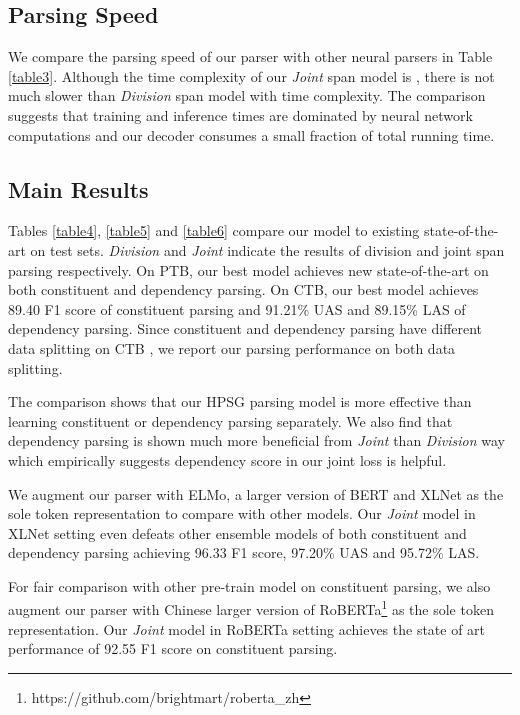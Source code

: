 \documentclass[11pt,a4paper]{article}
\begin{document}
\subsection{Parsing Speed}

We compare the
parsing speed of our parser with other neural parsers in Table \ref{table3}.
Although the time complexity of our \textit{Joint} span model is , there is not much slower than \textit{Division} span model with  time complexity.
The comparison suggests that training and inference
times are dominated by neural network computations and our decoder consumes a small fraction of total running time.

\subsection{Main Results}

Tables \ref{table4}, \ref{table5} and \ref{table6} compare our model to existing state-of-the-art on test sets.
\textit{Division} and \textit{Joint} indicate the results of division and joint span parsing respectively.
On PTB, our best model achieves new state-of-the-art on both constituent and dependency parsing.
On CTB, our best model achieves 89.40 F1 score of constituent parsing and 91.21\% UAS and 89.15\% LAS of dependency parsing.
Since constituent and dependency parsing have different data splitting on CTB \cite{ZhangD08, Liuandzhang2017B}, we report our parsing performance on both data splitting.

The comparison shows that our HPSG parsing model is more effective than learning constituent or dependency parsing separately.
We also find that dependency parsing is shown much more beneficial from \textit{Joint} than \textit{Division} way which empirically suggests dependency score in our joint loss is helpful.

We augment our parser with ELMo, a larger version of BERT and XLNet as the sole token representation to compare with other models.
Our \textit{Joint} model in XLNet setting even defeats other ensemble models of both constituent and dependency parsing achieving 96.33 F1 score, 97.20\% UAS and 95.72\% LAS.

For fair comparison with other pre-train model on constituent parsing, we also augment our parser with Chinese larger version of RoBERTa\footnote{https://github.com/brightmart/roberta\_zh} as the sole token representation.
Our \textit{Joint} model in RoBERTa setting achieves the state of art performance of 92.55 F1 score on constituent parsing.
\end{document}
